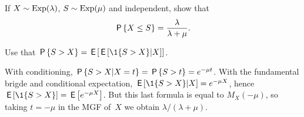 \documentclass[stochastic-or.tex]{subfiles}
\begin{document}
\begin{exercise}\label{ex:3}
 If  
$X\sim \Exp{\lambda}$, $S\sim\Exp{\mu}$  and independent, show that
 \begin{equation*}
 \P{X\leq S} = \frac{\lambda}{\lambda+\mu}.
 \end{equation*}
\begin{hint}
Use that $\P{S > X} = \E{\E{\1{S>X}|X}}$.
\end{hint}
\begin{solution}
With conditioning, $\P{S>X|X=t} = \P{S>t} =e^{-\mu t}$.
With the fundamental brigde and conditional expectation, $\E{\1{S>X}|X} = e^{-\mu X}$, hence $\E{\1{S>X}} = \E{e^{-\mu X}}$. But this last formula is equal to
$M_{X}(-\mu)$, so taking $t=-\mu$ in the MGF of~$X$ we obtain $\lambda/(\lambda+\mu)$.
\end{solution}
\end{exercise}


\end{document}
